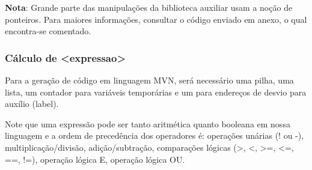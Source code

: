 \textbf{Nota}: Grande parte das manipulações da biblioteca auxiliar usam a noção de ponteiros. Para maiores informações, consultar o código enviado em anexo, o qual encontra-se comentado.

\subsubsection{Cálculo de <expressao>}

Para a geração de código em linguagem MVN, será necessário uma pilha, uma lista,  um contador para variáveis temporárias e um para endereços de desvio para auxílio (label). 


Note que uma expressão pode ser tanto aritmética quanto booleana em nossa linguagem e a ordem de precedência dos operadores é: operações unárias (! ou -), multiplicação/divisão, adição/subtração, comparações lógicas (>, <, >=, <=, ==, !=), operação lógica E, operação lógica OU. 

